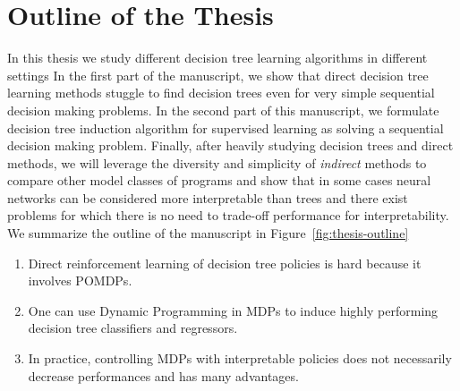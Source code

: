 \section{Outline of the Thesis}

In this thesis we study different decision tree learning algorithms in different settings 
In the first part of the manuscript, we show that direct decision tree learning methods stuggle to find decision trees even for very simple sequential decision making problems.
In the second part of this manuscript, we formulate decision tree induction algorithm for supervised learning as solving a sequential decision making problem. 
Finally, after heavily studying decision trees and direct methods, we will leverage the diversity and simplicity of \textit{indirect} methods to compare other model classes of programs and show that in some cases neural networks can be considered more interpretable than trees and there exist problems for which there is no need to trade-off performance for interpretability. 
We summarize the outline of the manuscript in Figure~\ref{fig:thesis-outline} 

\begin{enumerate}
    \item Direct reinforcement learning of decision tree policies is hard because it involves POMDPs.
    \item One can use Dynamic Programming in MDPs to induce highly performing decision tree classifiers and regressors.
    \item In practice, controlling MDPs with interpretable policies does not necessarily decrease performances and has many advantages.
\end{enumerate}

